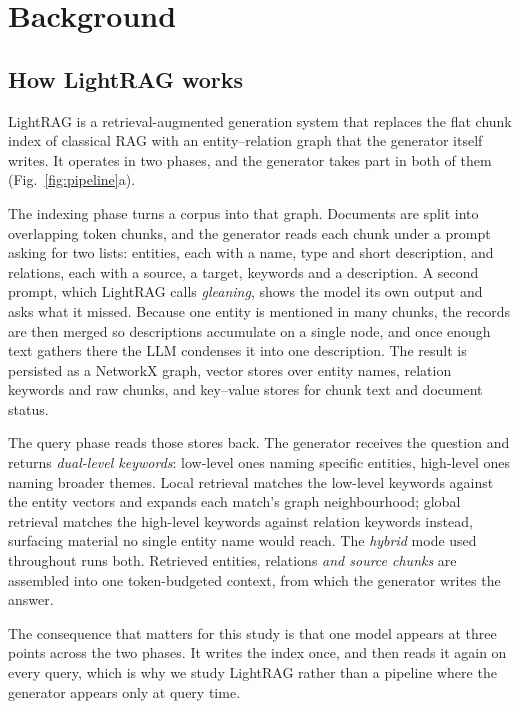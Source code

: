 \documentclass[conference, table]{IEEEtran}
\begin{document}
\section{Background}\label{sec:background}

\subsection{How LightRAG works}

\noindent
LightRAG \cite{lightrag2024} is a retrieval-augmented generation system that replaces the flat chunk index of classical RAG with an entity--relation graph that the generator itself writes. It operates in two phases, and the generator takes part in both of them (Fig.~\ref{fig:pipeline}a).

\noindent
The indexing phase turns a corpus into that graph. Documents are split into overlapping token chunks, and the generator reads each chunk under a prompt asking for two lists: entities, each with a name, type and short description, and relations, each with a source, a target, keywords and a description. A second prompt, which LightRAG calls \emph{gleaning}, shows the model its own output and asks what it missed. Because one entity is mentioned in many chunks, the records are then merged so descriptions accumulate on a single node, and once enough text gathers there the LLM condenses it into one description. The result is persisted as a NetworkX \cite{networkx} graph, vector stores \cite{nanovectordb} over entity names, relation keywords and raw chunks, and key--value stores for chunk text and document status.

\noindent
The query phase reads those stores back. The generator receives the question and returns \emph{dual-level keywords}: low-level ones naming specific entities, high-level ones naming broader themes. Local retrieval matches the low-level keywords against the entity vectors and expands each match's graph neighbourhood; global retrieval matches the high-level keywords against relation keywords instead, surfacing material no single entity name would reach. The \emph{hybrid} mode used throughout runs both. Retrieved entities, relations \emph{and source chunks} are assembled into one token-budgeted context, from which the generator writes the answer.

\noindent
The consequence that matters for this study is that one model appears at three points across the two phases. It writes the index once, and then reads it again on every query, which is why we study LightRAG rather than a pipeline where the generator appears only at query time.
\end{document}
